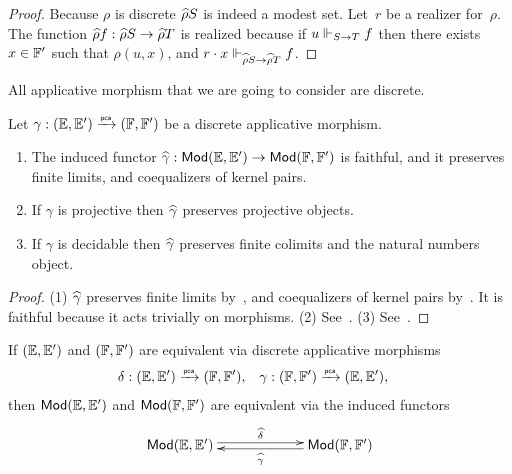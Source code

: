 \begin{proof}
  Because $\rho$ is discrete $\widehat{\rho} S$ is indeed a modest set.
  Let~$r$ be a realizer for~$\rho$. The function $\widehat{\rho} f :
  \widehat{\rho} S \to \widehat{\rho} T$ is realized because if $u \Vdash_{S \to T}
  f$ then there exists $x \in {\mathbb{F}'}$ such that $\rho(u, x)$, and $r
  \cdot x \Vdash_{\widehat{\rho} S \to \widehat{\rho} T} f$.
\end{proof}

All applicative morphism that we are going to consider are
discrete.

\begin{proposition}
  \label{th:applicative_morphisms_properties}%
  Let $\gamma: ({\mathbb{E}}, {\mathbb{E}'}) \xrightarrow{\scriptscriptstyle\mathsf{pca}}{}
  ({\mathbb{F}}, {\mathbb{F}'})$ be a discrete applicative morphism.
  \begin{enumerate}
  \item[(1)] The induced functor $\widehat{\gamma}: \mathsf{Mod}({\mathbb{E}}, {\mathbb{E}'}) \to
    \mathsf{Mod}({\mathbb{F}}, {\mathbb{F}'})$ is faithful, and it preserves finite limits,
    and coequalizers of kernel pairs.
  \item[(2)] If $\gamma$ is projective then $\widehat{\gamma}$ preserves
    projective objects.
  \item[(3)] If $\gamma$ is decidable then $\widehat{\gamma}$ preserves
    finite colimits and the natural numbers object.
  \end{enumerate}
\end{proposition}

\begin{proof}
  (1) $\widehat{\gamma}$ preserves finite limits
  by~\cite[Proposition~2.2.2]{Longley:94}, and coequalizers of kernel
  pairs by~\cite[Proposition~2.2.3]{Longley:94}. It is faithful
  because it acts trivially on morphisms.
  (2) See~\cite[Theorem~2.4.12]{Longley:94}.
  (3) See~\cite[Theorem~2.4.19]{Longley:94}.
\end{proof}


\begin{theorem}
  \label{th:applicative_morphisms_tfae}%
  If $({\mathbb{E}}, {\mathbb{E}'})$ and $({\mathbb{F}}, {\mathbb{F}'})$ are equivalent via discrete
  applicative morphisms
  \begin{align*}
    \delta &: ({\mathbb{E}}, {\mathbb{E}'}) \xrightarrow{\scriptscriptstyle\mathsf{pca}}{} ({\mathbb{F}}, {\mathbb{F}'}),
    &
    \gamma &: ({\mathbb{F}}, {\mathbb{F}'}) \xrightarrow{\scriptscriptstyle\mathsf{pca}}{} ({\mathbb{E}}, {\mathbb{E}'}),
  \end{align*}
  then $\mathsf{Mod}({\mathbb{E}}, {\mathbb{E}'})$ and $\mathsf{Mod}({\mathbb{F}}, {\mathbb{F}'})$ are equivalent
  via the induced functors
  \begin{equation*}
    \xymatrix{
      **[l]{\Mod{\EE, \subEE}} \ar@<0.5ex>[r]^{\ff{\delta}}
      &
      **[r]{\Mod{\FF, \subFF}} \ar@<0.5ex>[l]^{\ff{\gamma}}
      }
  \end{equation*}
\end{theorem}

